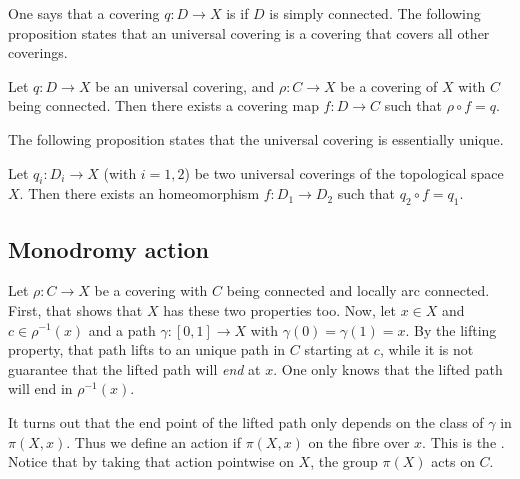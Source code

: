 One says that a covering $q\colon D\to X$ is  if $D$ is simply connected. The following proposition states that an universal covering is a covering that covers all other coverings.

\begin{proposition}
Let $q\colon D\to X$ be an universal covering, and $\rho\colon C\to X$ be a covering of $X$ with $C$ being connected. Then there exists a covering map $f\colon D\to C$ such that $\rho\circ f=q$.
\end{proposition}

The following proposition states that the universal covering is essentially unique.

\begin{proposition}
Let $q_i\colon D_i\to X$ (with $i=1,2$) be two universal coverings of the topological space $X$. Then there exists an homeomorphism $f\colon D_1\to D_2$ such that $q_2\circ f=q_1$.
\end{proposition}

					\subsection{Monodromy action}
\label{sssMonodromyact}

Let $\rho\colon C\to X$ be a covering with $C$ being connected and locally arc connected. First, that shows that $X$ has these two properties too. Now, let $x\in X$ and $c\in\rho^{-1}(x)$ and a path $\gamma\colon [0,1]\to X$ with $\gamma(0)=\gamma(1)=x$. By the lifting property, that path lifts to an unique path in $C$ starting at $c$, while it is not guarantee that the lifted path will \emph{end} at $x$. One only knows that the lifted path will end in $\rho^{-1}(x)$.

It turns out that the end point of the lifted path only depends on the class of $\gamma$ in $\pi(X,x)$. Thus we define an action if $\pi(X,x)$ on the fibre over $x$. This is the . Notice that by taking that action pointwise on $X$, the group $\pi(X)$ acts on $C$.
